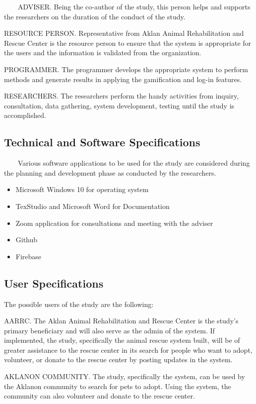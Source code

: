 ~~~~ADVISER. Being the co-author of the study, this person helps and supports the researchers on the duration of the conduct of the study.

RESOURCE PERSON. Representative from Aklan Animal Rehabilitation and Rescue Center is the resource person to ensure that the system is appropriate for the users and the information is validated from the organization.

PROGRAMMER. The programmer develops the appropriate system to perform methods and generate results in applying the gamification and log-in features.

RESEARCHERS. The researchers perform the handy activities from inquiry, consultation, data gathering, system development, testing until the study is accomplished.

\subsection{Technical and Software Specifications}

~~~~Various software applications to be used for the study are considered during the planning and development phase as conducted by the researchers.

\begin{itemize}
	\item Microsoft Windows 10 for operating system
	\item TexStudio and Microsoft Word for Documentation
	\item Zoom application for consultations and meeting with the adviser
	\item Github 
	\item Firebase
\end{itemize}

\subsection{User Specifications}

The possible users of the study are the following:

AARRC. The Aklan Animal Rehabilitation and Rescue Center is the study's primary beneficiary and will also serve as the admin of the system. If implemented, the study, specifically the animal rescue system built, will be of greater assistance to the rescue center in its search for people who want to adopt, volunteer, or donate to the rescue center by posting updates in the system.

AKLANON COMMUNITY. The study, specifically the system, can be used by the Aklanon community to search for pets to adopt. Using the system, the community can also volunteer and donate to the rescue center.


